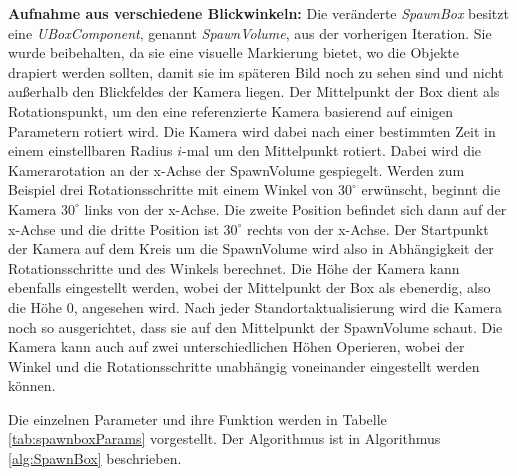 \textbf{Aufnahme aus verschiedene Blickwinkeln:} Die veränderte \textit{SpawnBox} besitzt eine \textit{UBoxComponent}, genannt \textit{SpawnVolume}, aus der vorherigen Iteration. Sie wurde beibehalten, da sie eine visuelle Markierung bietet, wo die Objekte drapiert werden sollten, damit sie im späteren Bild noch zu sehen sind und nicht außerhalb den Blickfeldes der Kamera liegen. Der Mittelpunkt der Box dient als Rotationspunkt, um den eine referenzierte Kamera basierend auf einigen Parametern rotiert wird. Die Kamera wird dabei nach einer bestimmten Zeit in einem einstellbaren Radius $i$-mal um den Mittelpunkt rotiert. Dabei wird die Kamerarotation an der x-Achse der SpawnVolume gespiegelt. Werden zum Beispiel drei Rotationsschritte mit einem Winkel von $30^\circ$ erwünscht, beginnt die Kamera $30^\circ$ links von der x-Achse. Die zweite Position befindet sich dann auf der x-Achse und die dritte Position ist $30^\circ$ rechts von der x-Achse. Der Startpunkt der Kamera auf dem Kreis um die SpawnVolume wird also in Abhängigkeit der Rotationsschritte und des Winkels berechnet. Die Höhe der Kamera kann ebenfalls eingestellt werden, wobei der Mittelpunkt der Box als ebenerdig, also die Höhe 0, angesehen wird. Nach jeder Standortaktualisierung wird die Kamera noch so ausgerichtet, dass sie auf den Mittelpunkt der SpawnVolume schaut. Die Kamera kann auch auf zwei unterschiedlichen Höhen Operieren, wobei der Winkel und die Rotationsschritte unabhängig voneinander eingestellt werden können. \par
Die einzelnen Parameter und ihre Funktion werden in Tabelle \ref{tab:spawnboxParams} vorgestellt. Der Algorithmus ist in Algorithmus \ref{alg:SpawnBox} beschrieben.

